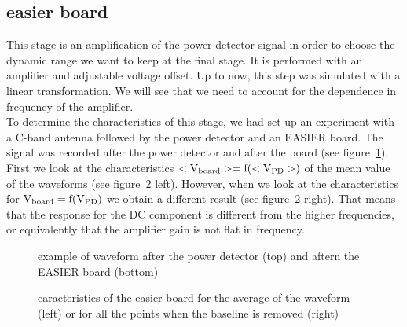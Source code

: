 \subsection{easier board}
This stage is  an amplification of the power  detector signal in order
to choose the dynamic range we want  to keep at the final stage. It is
performed with an amplifier and adjustable voltage offset.  Up to now,
this step  was simulated  with a linear  transformation.  We  will see
that  we  need to  account  for the  dependence  in  frequency of  the
amplifier.\\To determine the characteristics of this stage, we had set
up an experiment with a  C-band antenna followed by the power detector
and an EASIER board.  The signal was recorded after the power detector
and after the board  (see figure~\ref{fig:exampleboard}).  \\ First we
look  at the characteristics  $\rm <V_{board}>  = f(<V_{PD}>)$  of the
mean  value  of   the  waveforms  (see  figure~\ref{fig:carac}  left).
However,  when we  look at  the characteristics  for $\rm  V_{board} =
f(V_{PD})$  we obtain a  different result  (see figure~\ref{fig:carac}
right).   That  means  that  the  response for  the  DC  component  is
different  from  the  higher  frequencies, or  equivalently  that  the
amplifier gain is not flat in frequency.
\begin{figure}[!ht]
  \centering
  \hspace*{-3ex}
  \caption{example  of waveform  after  the power  detector (top)  and
    aftern the EASIER board (bottom) }
  \label{fig:exampleboard}
\end{figure}

\begin{figure}[!ht]
  \centering
  \hspace*{-3ex}
  \caption{caracteristics of  the easier board for the  average of the
    waveform (left) or for all the points when the baseline is removed
    (right)}
  \label{fig:carac}
\end{figure}

